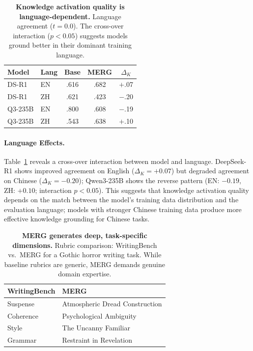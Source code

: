 \documentclass{article}
\begin{document}
\begin{table}
\vspace{-12pt}
\centering
\small
\caption{\textbf{Knowledge activation quality is language-dependent.} Language agreement ($t{=}0.0$). The cross-over interaction ($p < 0.05$) suggests models ground better in their dominant training language.}
\label{tab:language}
\renewcommand\tabcolsep{2.5pt}
\begin{tabular}{llccc}
\toprule
Model & Lang & Base & MERG & $\Delta_K$ \\
\midrule
DS-R1 & EN & .616 & .682 & $+$.07 \\
DS-R1 & ZH & .621 & .423 & $-$.20 \\
\midrule
Q3-235B & EN & .800 & .608 & $-$.19 \\
Q3-235B & ZH & .543 & .638 & $+$.10 \\
\bottomrule
\end{tabular}
\vspace{-8pt}
\end{table}
\paragraph{Language Effects.} Table~\ref{tab:language} reveals a cross-over interaction between model and language. DeepSeek-R1 shows improved agreement on English ($\Delta_K = +0.07$) but degraded agreement on Chinese ($\Delta_K = -0.20$); Qwen3-235B shows the reverse pattern (EN: $-0.19$, ZH: $+0.10$; interaction $p < 0.05$). This suggests that knowledge activation quality depends on the match between the model's training data distribution and the evaluation language; models with stronger Chinese training data produce more effective knowledge grounding for Chinese tasks.

\begin{table}[t]
\centering
\caption{\textbf{MERG generates deep, task-specific dimensions.} Rubric comparison: WritingBench vs.\ MERG for a Gothic horror writing task. While baseline rubrics are generic, MERG demands genuine domain expertise.}
\label{tab:rubric_example}
\small
\setlength{\tabcolsep}{10pt}
\begin{tabular}{p{}p{}}
\toprule
\textbf{WritingBench} & \textbf{MERG} \\
\midrule
Suspense & Atmospheric Dread Construction \\
Coherence & Psychological Ambiguity \\
Style & The Uncanny Familiar \\
Grammar & Restraint in Revelation \\
\bottomrule
\end{tabular}
\end{table}
\end{document}
